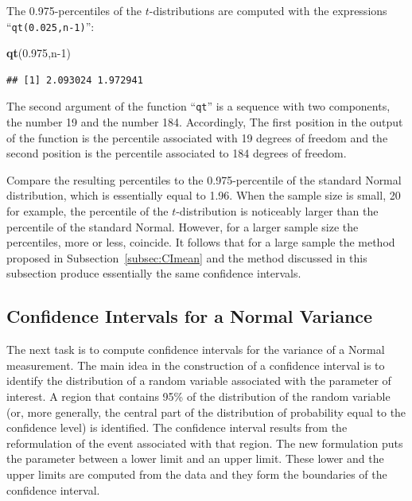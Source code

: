 \documentclass[
]{krantz}
\makeatletter
\newenvironment{Shaded}{\begin{snugshade}}{\end{snugshade}}
\newcommand{\DecValTok}[1]{\textcolor[rgb]{0.00,0.00,0.81}{#1}}
\newcommand{\FloatTok}[1]{\textcolor[rgb]{0.00,0.00,0.81}{#1}}
\newcommand{\KeywordTok}[1]{\textcolor[rgb]{0.13,0.29,0.53}{\textbf{#1}}}
\newcommand{\NormalTok}[1]{#1}
\newenvironment{kframe}{%
\medskip{}
\setlength{\fboxsep}{.8em}
 \def\at@end@of@kframe{}%
 \ifinner\ifhmode%
  \def\at@end@of@kframe{\end{minipage}}%
  \begin{minipage}{\columnwidth}%
 \fi\fi%
 \def\FrameCommand##1{\hskip\@totalleftmargin \hskip-\fboxsep
 \colorbox{shadecolor}{##1}\hskip-\fboxsep
     \hskip-\linewidth \hskip-\@totalleftmargin \hskip\columnwidth}%
 \MakeFramed {\advance\hsize-\width
   \@totalleftmargin\z@ \linewidth\hsize
   \@setminipage}}%
 {\par\unskip\endMakeFramed%
 \at@end@of@kframe}
\renewenvironment{Shaded}{\begin{kframe}}{\end{kframe}}
\theoremstyle{definition}
\theoremstyle{definition}
\theoremstyle{definition}
\theoremstyle{remark}
\makeatother
\begin{document}
The 0.975-percentiles of the \(t\)-distributions are computed with the
expressions ``\texttt{qt(0.025,n-1)}'':

\begin{Shaded}
\begin{Highlighting}[]
\KeywordTok{qt}\NormalTok{(}\FloatTok{0.975}\NormalTok{,n}\DecValTok{-1}\NormalTok{)}
\end{Highlighting}
\end{Shaded}

\begin{verbatim}
## [1] 2.093024 1.972941
\end{verbatim}

The second argument of the function ``\texttt{qt}'' is a sequence with two
components, the number 19 and the number 184. Accordingly, The first
position in the output of the function is the percentile associated with
19 degrees of freedom and the second position is the percentile
associated to 184 degrees of freedom.

Compare the resulting percentiles to the 0.975-percentile of the
standard Normal distribution, which is essentially equal to 1.96. When
the sample size is small, 20 for example, the percentile of the
\(t\)-distribution is noticeably larger than the percentile of the
standard Normal. However, for a larger sample size the percentiles, more
or less, coincide. It follows that for a large sample the method
proposed in Subsection~\ref{subsec:CImean} and the method
discussed in this subsection produce essentially the same confidence
intervals.

\hypertarget{confidence-intervals-for-a-normal-variance}{%
\subsection{Confidence Intervals for a Normal Variance}\label{confidence-intervals-for-a-normal-variance}}

The next task is to compute confidence intervals for the variance of a
Normal measurement. The main idea in the construction of a confidence
interval is to identify the distribution of a random variable associated
with the parameter of interest. A region that contains 95\% of the
distribution of the random variable (or, more generally, the central
part of the distribution of probability equal to the confidence level)
is identified. The confidence interval results from the reformulation of
the event associated with that region. The new formulation puts the
parameter between a lower limit and an upper limit. These lower and the
upper limits are computed from the data and they form the boundaries of
the confidence interval.
\end{document}
